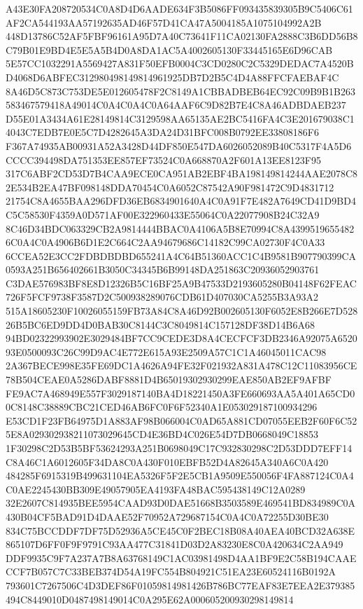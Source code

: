 \documentclass[UTF8,fontset=fandol,zihao=-4,a4paper]{ctexart}
\begin{document}
{{A43E30FA208720534C0A8D4D6AADE634F3B5086FF093435839305B9C5406C61AF2CA544193AA57192635AD46F57D41CA47A5004185A1075104992A2B
448D13786C52AF5FBF96161A95D7A40C73641F11CA02130FA2888C3B6DD56B8C79B01E9BD4E5E5A5B4D0A8DA1AC5A4002605130F33445165E6D96CAB
5E57CC1032291A5569427A831F50EFB0004C3CD0280C2C5329DEDAC7A4520BD4068D6ABFEC312980498149814961925DB7D2B5C4D4A88FFCFAEBAF4C
8A46D5C873C753DE5E012605478F2C8149A1CBBADBEB64EC92C09B9B1B263583467579418A49014C0A4C0A4C0A64AAF6C9D82B7E4C8A46ADBDAEB237
D55E01A3434A61E28149814C3129598AA65135AE2BC5416FA4C3E201679038C14043C7EDB7E0E5C7D4282645A3DA24D31BFC008B0792EE33808186F6
F367A74935AB00931A52A3428D44DF850E547DA6026052089B40C5317F4A5D6CCCC394498DA751353EE857EF73524C0A668870A2F601A13EE8123F95
317C6ABF2CD53D7B4CAA9ECE0CA951AB2EBF4BA198149814244AAE2078C82E534B2EA47BF098148DDA70454C0A6052C87542A90F981472C9D4831712
21754C8A4655BAA296DFD36EB6834901640A4C0A91F7E482A7649CD41D9BD4C5C58530F4359A0D571AF00E322960433E55064C0A22077908B24C32A9
8C46D34BDC063329CB2A9814444BBAC0A4106A5B8E70994C8A43995196554826C0A4C0A4906B6D1E2C664C2AA94679686C14182C99CA02730F4C0A33
6CCEA52E3CC2FDBDBDBD655241A4C64B51360ACC1C4B9581B907790399CA0593A251B656402661B3050C34345B6B99148DA251863C20936052903761
C3DAE576983BF8E8D12326B5C16BF25A9B47533D2193605280B04148F62FEAC726F5FCF9738F3587D2C500938289076CDB61D407030CA5255B3A93A2
515A18605230F10026055159FB73A84C8A46D92B002605130F6052E8B266E7D52826B5BC6ED9DD4D0BAB30C8144C3C8049814C157128DF38D14B6A68
94BD02322993902E3029484BF7CC9CEDE3D8A4CECFCF3DB2346A92075A652093E0500093C26C99D9AC4E772E615A93E2509A57C1C1A46045011CAC98
2A367BECE998E35FE69DC1A4626A94FE32F021932A831A478C12C11083956CE78B504CEAE0A5286DABF8881D4B65019302930299EAE850AB2EF9AFBF
FE9AC7A468949E557F3029187140BA4D18221450A3FE660693AA5A401A65CD00C8148C38889CBC21CED46AB6FC0F6F52340A1E053029187100934296
E53CD1F23FB64975D1A883AF98B066004C0AD65A881CD07055EEB2F60F6C525E8A029302938211073029645CD4E36BD4C026E54D7DB0668049C18853
1F30298C2D53B5BF53624293A251B0698049C17C932830298C2D53DDD7EFF14C8A46C1A6012605F34DA8C0A430F010EBFB52D4A82645A340A6C0A420
484285F6915319B499631104EA5326F5F2E5CB1A9509E550056F4FA887124C0A4C0AE2245430BB309E49057905EA4193FA48BAC595438149C12A0289
32E2607C814935BEE5954CAAD93D0DAE51668B3503589E469541BD834989C0A430B04CF5BAD91D4DAAE52F70952A729687154C0A4C0A72255D30BE30
834C75BCCDDF7DF75D52936A5CE45C0F2BEC18B08A40AEA40BCD32A638E865107D6FF0F9F9791C93AA477C31841D03D2A83230E8C0A420634C2AA949
DDF9935C9F7A237A7B8A63768149C1AC03981498D4AA1BF9E2C58B194CAAECCF7B057C7C33BEB374D54A19FC554B804921C51EA23E60524116B0192A
793601C7267506C4D3DEF86F01059814981426B786BC77EAF83E7EEA2E379385494C8449010D0487498149014C0A295E62A000605200930298149814
}}
\end{document}
